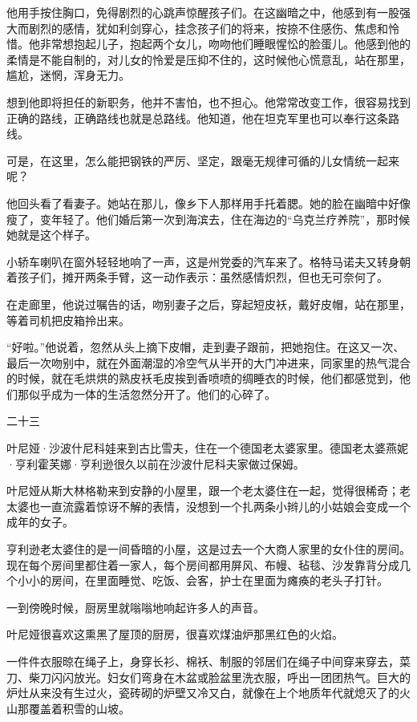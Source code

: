 他用手按住胸口，免得剧烈的心跳声惊醒孩子们。在这幽暗之中，他感到有一股强大而剧烈的感情，犹如利剑穿心，挂念孩子们的将来，按捺不住感伤、焦虑和怜惜。他非常想抱起儿子，抱起两个女儿，吻吻他们睡眼惺忪的脸蛋儿。他感到他的柔情是不能自制的，对儿女的怜爱是压抑不住的，这时候他心慌意乱，站在那里，尴尬，迷惘，浑身无力。

想到他即将担任的新职务，他并不害怕，也不担心。他常常改变工作，很容易找到正确的路线，正确路线也就是总路线。他知道，他在坦克军里也可以奉行这条路线。

可是，在这里，怎么能把钢铁的严厉、坚定，跟毫无规律可循的儿女情统一起来呢？

他回头看了看妻子。她站在那儿，像乡下人那样用手托着腮。她的脸在幽暗中好像瘦了，变年轻了。他们婚后第一次到海滨去，住在海边的“乌克兰疗养院”，那时候她就是这个样子。

小轿车喇叭在窗外轻轻地响了一声，这是州党委的汽车来了。格特马诺夫又转身朝着孩子们，摊开两条手臂，这一动作表示：虽然感情炽烈，但也无可奈何了。

在走廊里，他说过嘱告的话，吻别妻子之后，穿起短皮袄，戴好皮帽，站在那里，等着司机把皮箱拎出来。

“好啦。”他说着，忽然从头上摘下皮帽，走到妻子跟前，把她抱住。在这又一次、最后一次吻别中，就在外面潮湿的冷空气从半开的大门冲进来，同家里的热气混合的时候，就在毛烘烘的熟皮袄毛皮挨到香喷喷的绸睡衣的时候，他们都感觉到，他们那似乎成为一体的生活忽然分开了。他们的心碎了。

二十三

叶尼娅·沙波什尼科娃来到古比雪夫，住在一个德国老太婆家里。德国老太婆燕妮·亨利霍芙娜·亨利逊很久以前在沙波什尼科夫家做过保姆。

叶尼娅从斯大林格勒来到安静的小屋里，跟一个老太婆住在一起，觉得很稀奇；老太婆也一直流露着惊讶不解的表情，没想到一个扎两条小辫儿的小姑娘会变成一个成年的女子。

亨利逊老太婆住的是一间昏暗的小屋，这是过去一个大商人家里的女仆住的房间。现在每个房间里都住着一家人，每个房间都用屏风、布幔、毡毯、沙发靠背分成几个小小的房间，在里面睡觉、吃饭、会客，护士在里面为瘫痪的老头子打针。

一到傍晚时候，厨房里就嗡嗡地响起许多人的声音。

叶尼娅很喜欢这熏黑了屋顶的厨房，很喜欢煤油炉那黑红色的火焰。

一件件衣服晾在绳子上，身穿长衫、棉袄、制服的邻居们在绳子中间穿来穿去，菜刀、柴刀闪闪放光。妇女们弯身在木盆或脸盆里洗衣服，呼出一团团热气。巨大的炉灶从来没有生过火，瓷砖砌的炉壁又冷又白，就像在上个地质年代就熄灭了的火山那覆盖着积雪的山坡。

